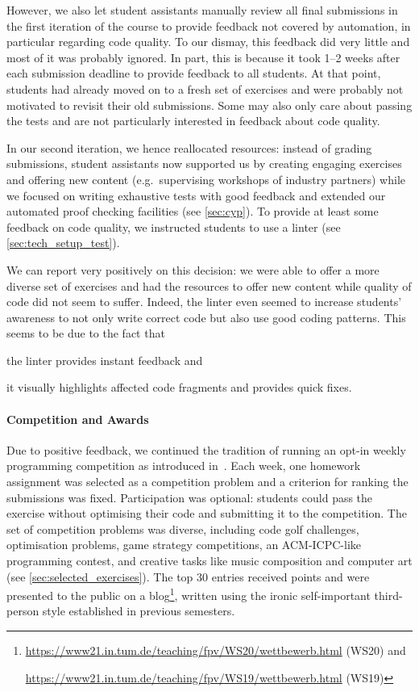 However, we also let student assistants manually review all final submissions
in the first iteration of the course
to provide feedback not covered by automation,
in particular regarding code quality.
To our dismay, this feedback did very little and
most of it was probably ignored.
In part, this is because it took 1--2 weeks after each submission deadline to provide feedback to all students.
At that point, students had already moved on to a fresh set of exercises and were probably not motivated to revisit their old submissions.
Some may also only care about passing the tests
and are not particularly interested in feedback about code quality.

In our second iteration, we hence reallocated resources:
instead of grading submissions,
student assistants now supported us by creating engaging exercises
and offering new content (e.g.\ supervising workshops of industry partners)
while we focused on writing exhaustive tests with good feedback and extended our automated proof checking facilities (see \cref{sec:cyp}).
To provide at least some feedback on
code quality, we instructed students
to use a linter (see \cref{sec:tech_setup_test}).

We can report very positively on this decision:
we were able to offer a more diverse set of exercises and
had the resources to offer new content
while quality of code did not seem to suffer.
Indeed, the linter even seemed to increase students' awareness
to not only write correct code but also use good coding patterns.
This seems to be due to the fact that
\begin{enumerate*}[label=\arabic*)]
  \item the linter provides instant feedback and
  \item it visually highlights affected code fragments and provides quick fixes.
\end{enumerate*}

\paragraph{Competition and Awards}

Due to positive feedback,
we continued the tradition of running an opt-in weekly
programming competition as introduced in~\cite{next_1100}.
Each week, one homework assignment
was selected as a competition problem
and a criterion for ranking the submissions was fixed.
Participation was optional:
students could pass the exercise without optimising their code and submitting it to the competition.
The set of competition problems was diverse,
including code golf challenges,
optimisation problems,
game strategy competitions,
an ACM-ICPC-like programming contest,
and creative tasks like music composition
and computer art (see \cref{sec:selected_exercises}).
The top 30 entries received points
and were presented to the public on a blog\footnote{\url{https://www21.in.tum.de/teaching/fpv/WS20/wettbewerb.html} (WS20) and

\url{https://www21.in.tum.de/teaching/fpv/WS19/wettbewerb.html} (WS19)},
written using the ironic self-important third-person style established in previous semesters.


